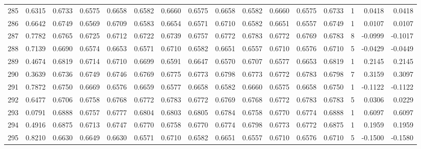 \begin{tabular}{lrrrrrrrrrrrrrrr}
285 &      0.6315 &  0.6733 &  0.6575 &  0.6658 &  0.6582 &  0.6660 &  0.6575 &  0.6658 &  0.6582 &  0.6660 &   0.6575 &     0.6733 &      1 &                    0.0418 &                     0.0418 \\
286 &      0.6642 &  0.6749 &  0.6569 &  0.6709 &  0.6583 &  0.6654 &  0.6571 &  0.6710 &  0.6582 &  0.6651 &   0.6557 &     0.6749 &      1 &                    0.0107 &                     0.0107 \\
287 &      0.7782 &  0.6765 &  0.6725 &  0.6712 &  0.6722 &  0.6739 &  0.6757 &  0.6772 &  0.6783 &  0.6772 &   0.6769 &     0.6783 &      8 &                   -0.0999 &                    -0.1017 \\
288 &      0.7139 &  0.6690 &  0.6574 &  0.6653 &  0.6571 &  0.6710 &  0.6582 &  0.6651 &  0.6557 &  0.6710 &   0.6576 &     0.6710 &      5 &                   -0.0429 &                    -0.0449 \\
289 &      0.4674 &  0.6819 &  0.6714 &  0.6710 &  0.6699 &  0.6591 &  0.6647 &  0.6570 &  0.6707 &  0.6577 &   0.6653 &     0.6819 &      1 &                    0.2145 &                     0.2145 \\
290 &      0.3639 &  0.6736 &  0.6749 &  0.6746 &  0.6769 &  0.6775 &  0.6773 &  0.6798 &  0.6773 &  0.6772 &   0.6783 &     0.6798 &      7 &                    0.3159 &                     0.3097 \\
291 &      0.7872 &  0.6750 &  0.6669 &  0.6576 &  0.6659 &  0.6577 &  0.6658 &  0.6582 &  0.6660 &  0.6575 &   0.6658 &     0.6750 &      1 &                   -0.1122 &                    -0.1122 \\
292 &      0.6477 &  0.6706 &  0.6758 &  0.6768 &  0.6772 &  0.6783 &  0.6772 &  0.6769 &  0.6768 &  0.6772 &   0.6783 &     0.6783 &      5 &                    0.0306 &                     0.0229 \\
293 &      0.0791 &  0.6888 &  0.6757 &  0.6777 &  0.6804 &  0.6803 &  0.6805 &  0.6784 &  0.6758 &  0.6770 &   0.6774 &     0.6888 &      1 &                    0.6097 &                     0.6097 \\
294 &      0.4916 &  0.6875 &  0.6713 &  0.6747 &  0.6770 &  0.6758 &  0.6770 &  0.6774 &  0.6798 &  0.6773 &   0.6772 &     0.6875 &      1 &                    0.1959 &                     0.1959 \\
295 &      0.8210 &  0.6630 &  0.6649 &  0.6630 &  0.6571 &  0.6710 &  0.6582 &  0.6651 &  0.6557 &  0.6710 &   0.6576 &     0.6710 &      5 &                   -0.1500 &                    -0.1580 \\

\end{tabular}
